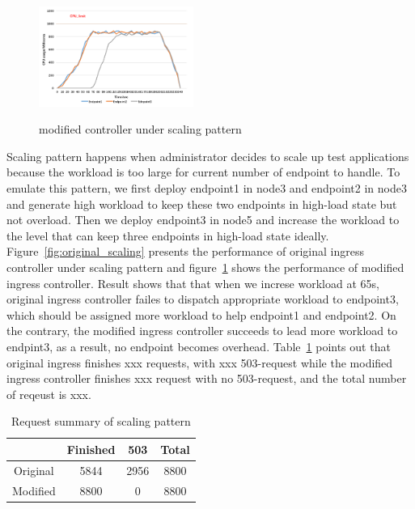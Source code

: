\begin{figure}[!htb]
 \centering
 \includegraphics[width=0.45\textwidth]{images/data4.png}\\
 \caption{modified controller under scaling pattern}
 \label{fig:modified_scaling}
\end{figure}
Scaling pattern happens when administrator decides to scale up test applications because the workload is too large for current number of endpoint to handle.
To emulate this pattern, we first deploy endpoint1 in node3 and endpoint2 in node3 and generate high workload to keep these two endpoints in high-load state but not overload.
Then we deploy endpoint3 in node5 and increase the workload to the level that can keep three endpoints in high-load state ideally. Figure~{\ref{fig:original_scaling}} presents the performance of
original ingress controller under scaling pattern and figure~{\ref{fig:modified_scaling}} shows the performance of modified ingress controller. Result shows that that when we increse workload at 65s,
original ingress controller failes to dispatch appropriate workload to endpoint3, which should be assigned more workload to help endpoint1 and endpoint2. On the contrary,
the modified ingress controller succeeds to lead more workload to endpint3, as a result, no endpoint becomes overhead. Table~{\ref{table:request_summary2}} points out that original ingress finishes
xxx requests, with xxx 503-request while the modified ingress controller finishes xxx request with no 503-request, and the total number of reqeust is xxx.
\hspace{0pt}
\begin{table}[htbp]
 \begin{center}
  \begin{tabular}{c|c|c|c}
   \hline
            & Finished & 503  & Total \\  \hline
   Original & 5844     & 2956 & 8800  \\ \hline
   Modified & 8800     & 0    & 8800  \\ \hline
  \end{tabular}
 \end{center}
 \caption{Request summary of scaling pattern}
 \label{table:request_summary2}
\end{table}

